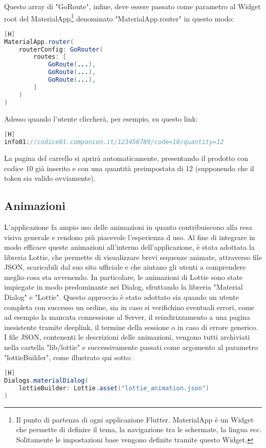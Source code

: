 \noindent
Questo array di "GoRoute", infine, deve essere passato come parametro al Widget root del MaterialApp\footnote{Il punto di partenza di ogni applicazione Flutter. MaterialApp è un Widget che permette di definire il tema, la navigazione tra le schermate, la lingua ecc. Solitamente le impostazioni base vengono definite tramite questo Widget.} denominato "MaterialApp.router" in questo modo:
\begin{lstlisting}[language=Java, firstnumber=1][H]
MaterialApp.router(
	routerConfig: GoRouter(
		routes: [
			GoRoute(...),
			GoRoute(...),
			GoRoute(...),
		]
	)
)
\end{lstlisting}

\noindent
Adesso quando l'utente cliccherà, per esempio, su questo link:
\begin{lstlisting}[language=Java][H]
info01://codice01.companion.it/123456789/code=10/quantity=12
\end{lstlisting}

\noindent
La pagina del carrello si aprirà automaticamente, presentando il prodotto con codice 10 già inserito e con una quantità preimpostata di 12 (supponendo che il token sia valido ovviamente).

\subsection{Animazioni}
L'applicazione fa ampio uso delle animazioni in quanto contribuiscono alla resa visiva generale e rendono più piacevole l'esperienza d uso. Al fine di integrare in modo efficace queste animazioni all'interno dell'applicazione, è stata adottata la libreria Lottie, che permette di visualizzare brevi sequenze animate, attraverso file JSON, scaricabili dal suo sito ufficiale e che aiutano gli utenti a comprendere meglio cosa sta avvenendo.
In particolare, le animazioni di Lottie sono state impiegate in modo predominante nei Dialog, sfruttando la libreria "Material Dialog" e "Lottie". Questo approccio è stato adottato sia quando un utente completa con successo un ordine, sia in caso si verifichino eventuali errori, come ad esempio la mancata connessione al Server, il reindirizzamento a una pagina inesistente tramite deeplink, il termine della sessione o in caso di errore generico. I file JSON, contenenti le descrizioni delle animazioni, vengono tutti archiviati nella cartella "lib/lottie" e successivamente passati come argomento al parametro "lottieBuilder", come illustrato qui sotto:
\begin{lstlisting}[language=Java, firstnumber=1][H]
Dialogs.materialDialog(
	lottieBuilder: Lottie.asset("lottie_animation.json")
)	
\end{lstlisting}

\noindent